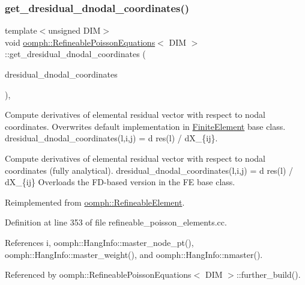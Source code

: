 \subsubsection{\texorpdfstring{get\+\_\+dresidual\+\_\+dnodal\+\_\+coordinates()}{get\_dresidual\_dnodal\_coordinates()}}
{\footnotesize\ttfamily template$<$unsigned D\+IM$>$ \\
void \hyperlink{classoomph_1_1RefineablePoissonEquations}{oomph\+::\+Refineable\+Poisson\+Equations}$<$ D\+IM $>$\+::get\+\_\+dresidual\+\_\+dnodal\+\_\+coordinates (\begin{DoxyParamCaption}\item[{\hyperlink{classoomph_1_1RankThreeTensor}{Rank\+Three\+Tensor}$<$ double $>$ \&}]{dresidual\+\_\+dnodal\+\_\+coordinates }\end{DoxyParamCaption})\hspace{0.3cm}{\ttfamily [private]}, {\ttfamily [virtual]}}



Compute derivatives of elemental residual vector with respect to nodal coordinates. Overwrites default implementation in \hyperlink{classoomph_1_1FiniteElement}{Finite\+Element} base class. dresidual\+\_\+dnodal\+\_\+coordinates(l,i,j) = d res(l) / d\+X\+\_\+\{ij\}. 

Compute derivatives of elemental residual vector with respect to nodal coordinates (fully analytical). dresidual\+\_\+dnodal\+\_\+coordinates(l,i,j) = d res(l) / d\+X\+\_\+\{ij\} Overloads the F\+D-\/based version in the FE base class. 

Reimplemented from \hyperlink{classoomph_1_1RefineableElement_a83d4f26d6f427a6c9001c65c4263c622}{oomph\+::\+Refineable\+Element}.



Definition at line 353 of file refineable\+\_\+poisson\+\_\+elements.\+cc.



References i, oomph\+::\+Hang\+Info\+::master\+\_\+node\+\_\+pt(), oomph\+::\+Hang\+Info\+::master\+\_\+weight(), and oomph\+::\+Hang\+Info\+::nmaster().



Referenced by oomph\+::\+Refineable\+Poisson\+Equations$<$ D\+I\+M $>$\+::further\+\_\+build().

\mbox{\label{classoomph_1_1RefineablePoissonEquations_a5e0651853bb43a4636168562a9ce854c}} 
